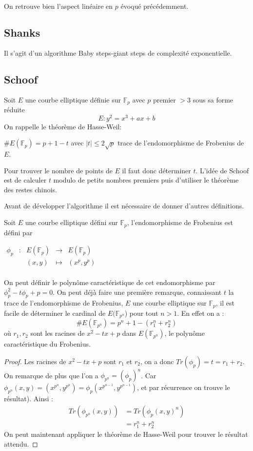 \documentclass{article}
\begin{document}
On retrouve bien l'aspect linéaire en $p$ évoqué précédemment.
\subsection{Shanks}
Il s'agit d'un algorithme Baby steps-giant steps de complexité exponentielle.

\subsection{Schoof}
Soit $E$ une courbe elliptique définie sur $\mathbb{F}_p$ avec $p$ premier $>3$ sous sa forme réduite 
$$ E: y^2 = x^3 + ax+b$$
On rappelle le théorème de Hasse-Weil:

\begin{thm}
$\#E(\mathbb{F}_p) = p + 1 - t$ avec $|t| \leq 2 \sqrt{p}$ trace de l'endomorphisme de Frobenius de $E$.
\end{thm}
Pour trouver le nombre de points de $E$ il faut donc déterminer $t$. 
L'idée de Schoof est de calculer $t$ modulo de petits nombres premiers puis d'utiliser le théorème des restes chinois. 

Avant de développer l'algorithme il est nécessaire de donner d'autres définitions. 

\begin{defi}[Frobenius]
Soit $E$ une courbe elliptique défini sur $\mathbb{F}_p$, l'endomorphisme de Frobenius est défini par 

$\begin{array}{ccccc}
\phi_p & : & E(\mathbb{F}_p) & \to & E(\mathbb{F}_p) \\
 & & (x,y) & \mapsto & (x^p, y^p) \\
\end{array}$
\end{defi}
On peut définir le polynôme caractéristique de cet endomorphisme par $\phi_p^2 - t \phi_p + p = 0$.
On peut déjà faire une première remarque, connaissant $t$ la trace de l'endomorphisme de Frobenius, $E$ une courbe elliptique sur $\mathbb{F}_p$, il est facile de déterminer le cardinal de $E(\mathbb{F}_{p^n}$) pour tout $n >1$. En effet on a :
\begin{equation*}
\#E(\mathbb{F}_{p^n}) = p^n + 1- (r_1^n + r_2^n)
\end{equation*}
où $r_1, r_2$ sont les racines de $x^2 - tx +p$ dans $E(\mathbb{F}_{p^n})$, le polynôme caractéristique du Frobenius.
\begin{proof}
Les racines de $x^2 - tx +p$ sont $r_1$ et $r_2$, on a donc $Tr(\phi_p) = t = r_1 + r_2$. 
\newline
On remarque de plus que l'on a $\phi_{p^n} = (\phi_p)^n$. Car $\phi_{p^n} (x,y) = (x^{p^n}, y^{p^n}) = \phi_p  (x^{p^{n-1}}, y^{p^{n-1}})$, et par récurrence on trouve le résultat).
\newline
Ainsi : 
\begin{align*}
Tr(\phi_{p^n} (x,y)) &= Tr(\phi_{p} (x,y)^n) \\
					 &= r_1^n + r_2^n	 
\end{align*}
On peut maintenant appliquer le théorème de Hasse-Weil pour trouver le résultat attendu.
\end{proof}
\end{document}
